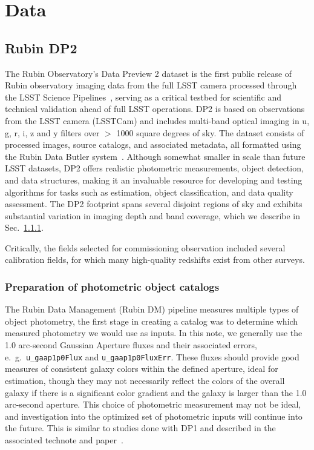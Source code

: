 \section{Data}
\label{sec:data:0}

\subsection{Rubin DP2}
\label{sec:data:dp2}

The Rubin Observatory’s Data Preview 2 dataset is the first public release of Rubin observatory imaging data from the full LSST camera processed through the LSST Science Pipelines~\citep{PSTN-019}, serving as a critical testbed for scientific and technical validation ahead of full LSST operations.  DP2 is based on observations from the LSST camera (LSSTCam) and includes multi-band optical imaging in u, g, r, i, z and y filters over $>$ 1000 square degrees of sky.  The dataset consists of processed images, source catalogs, and associated metadata, all formatted using the Rubin Data Butler system~\citep{2022SPIE12189E..11J}.  Although somewhat smaller in scale than future LSST datasets, DP2 offers realistic photometric measurements, object detection, and data structures, making it an invaluable resource for developing and testing algorithms for tasks such as \photoz estimation, object classification, and data quality assessment.   The DP2 footprint spans several disjoint regions of sky and exhibits substantial variation in imaging depth and band coverage, which we describe in Sec.~\ref{sec:data:dp2:preparation}.

Critically, the fields selected for commissioning observation included several calibration fields, for which many high-quality redshifts exist from other surveys.


\subsubsection{Preparation of photometric object catalogs}
\label{sec:data:dp2:preparation}

The Rubin Data Management (Rubin DM) pipeline measures multiple types of object photometry, the first stage in creating a \photoz catalog was to determine which measured photometry we would use as inputs.  In this note, we generally use the 1.0 arc-second Gaussian Aperture fluxes and their associated errors, e.~g.~\texttt{u\_gaap1p0Flux} and \texttt{u\_gaap1p0FluxErr}.  These fluxes should provide good measures of consistent galaxy colors within the defined aperture, ideal for \photoz estimation, though they may not necessarily reflect the colors of the overall galaxy if there is a significant color gradient and the galaxy is larger than the 1.0 arc-second aperture.  This choice of photometric measurement may not be ideal, and investigation into the optimized set of photometric inputs will continue into the future.   This is similar to studies done with DP1 and described in the associated technote and paper~\citep{SITCOMTN-154, dp1_pz_paper}.

